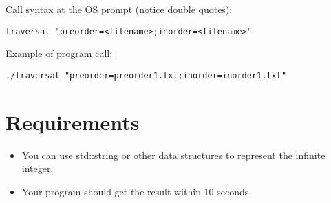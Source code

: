\documentclass[times,11pt,verbatim,js-singlespace]{article}  %
\begin{document}
Call syntax at the OS prompt (notice double quotes):
\begin{verbatim}
traversal "preorder=<filename>;inorder=<filename>"
\end{verbatim}

Example of program call:
\begin{verbatim}
./traversal "preorder=preorder1.txt;inorder=inorder1.txt"
\end{verbatim}
\section{Requirements}
\begin{itemize}
\item You can use std::string or other data structures to represent the infinite integer.
\item Your program should get the result within 10 seconds.
\end{itemize}
\end{document}
